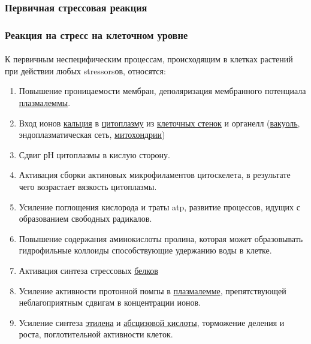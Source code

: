 \subsubsection*{Первичная стрессовая реакция}

\subsubsection*{Реакция на стресс на клеточном уровне}

\paragraph*{}К первичным неспецифическим процессам, происходящим в клетках растений при действии любых \gls{stressors}ов, относятся:

\begin{enumerate}
	\item Повышение проницаемости мембран, деполяризация мембранного потенциала \hyperlink{plasmolema}{плазмалеммы}.
	\item Вход ионов \hyperlink{calcium}{кальция} в \hyperlink{citoplasma}{цитоплазму} из \hyperlink{cell_wall}{клеточных стенок} и органелл (\hyperlink{cell_vakuol}{вакуоль}, эндоплазматическая сеть, \hyperlink{mitohondria}{митохондрии})
	\item Сдвиг рН цитоплазмы в кислую сторону.
	\item Активация сборки актиновых микрофиламентов цитоскелета, в результате чего возрастает вязкость цитоплазмы.
	\item Усиление поглощения кислорода и траты \gls{atp}, развитие процессов, идущих с образованием свободных радикалов.
	\item Повышение содержания аминокислоты пролина, которая может образовывать гидрофильные коллоиды способствующие удержанию воды в клетке. 
	\item Активация синтеза стрессовых \hyperlink{proteins}{белков}
	\item Усиление активности протонной помпы в \hyperlink{plasmolema}{плазмалемме}, препятствующей неблагоприятным сдвигам в концентрации ионов.
	\item Усиление синтеза \hyperlink{eten}{этилена} и \hyperlink{abscizeAcid}{абсцизовой кислоты}, торможение деления и роста, поглотительной активности клеток.
\end{enumerate}


